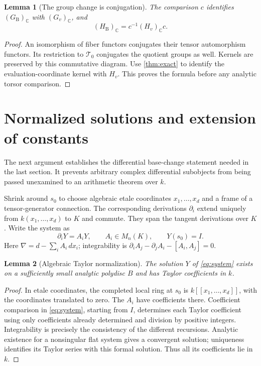 \documentclass[11pt]{article}
\numberwithin{equation}{section}
\newtheorem{lemma}[lemma]{Lemma}
\theoremstyle{definition}
\theoremstyle{remark}
\newcommand{\C}{\mathbb C}
\newcommand{\Tcal}{\mathcal T}
\newcommand{\B}{\mathrm B}
\begin{document}
\begin{lemma}[The group change is conjugation]\label{lem:conjugation}
The comparison $c$ identifies $(G_\B)_\C$ with $(G_v)_\C$, and
\[
 (H_\B)_\C=c^{-1}(H_v)_\C c.
\]
\end{lemma}
\begin{proof}
An isomorphism of fiber functors conjugates their tensor automorphism
functors. Its restriction to $\Tcal_0$ conjugates the quotient groups
as well. Kernels are preserved by this commutative diagram. Use
\cref{thm:exact} to identify the evaluation-coordinate kernel with
$H_v$. This proves the formula before any analytic torsor comparison.
\end{proof}

\section{Normalized solutions and extension of constants}\label{sec:pv-base-change}

The next argument establishes the differential base-change statement
needed in the last section. It prevents arbitrary complex differential
subobjects from being passed unexamined to an arithmetic theorem over $k$.

Shrink around $s_0$ to choose algebraic etale coordinates
$x_1,\ldots,x_d$ and a frame of a tensor-generator connection. The
corresponding derivations $\partial_i$ extend uniquely from
$k(x_1,\ldots,x_d)$ to $K$ and commute. They span the tangent derivations
over $K$. Write the system as
\begin{equation}\label{eq:system}
 \partial_iY=A_iY,\qquad A_i\in M_n(K),\qquad Y(s_0)=I.
\end{equation}
Here $\nabla=d-\sum_iA_i\,dx_i$; integrability is
$\partial_iA_j-\partial_jA_i-[A_i,A_j]=0$.

\begin{lemma}[Algebraic Taylor normalization]\label{lem:taylor}
The solution $Y$ of \eqref{eq:system} exists on a sufficiently small
analytic polydisc $B$ and has Taylor coefficients in $k$.
\end{lemma}
\begin{proof}
In etale coordinates, the completed local ring at $s_0$ is
$k[[x_1,\ldots,x_d]]$, with the coordinates translated to zero.
The $A_i$ have coefficients there. Coefficient comparison in
\eqref{eq:system}, starting from $I$, determines each Taylor coefficient
using only coefficients already determined and division by positive
integers. Integrability is precisely the consistency of the different
recursions. Analytic existence for a nonsingular flat system gives a
convergent solution; uniqueness identifies its Taylor series with this
formal solution. Thus all its coefficients lie in $k$.
\end{proof}
\end{document}
